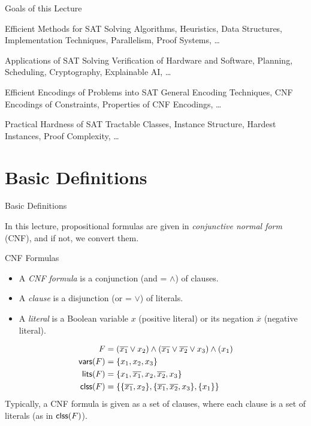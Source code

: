 \documentclass[t]{sdqbeamer}
\begin{document}
\begin{frame}{Goals of this Lecture}
\begin{block}{Efficient Methods for SAT Solving}
	Algorithms, Heuristics, Data Structures, Implementation Techniques, Parallelism, Proof Systems, \dots
\end{block}
\pause
\begin{block}{Applications of SAT Solving}
	Verification of Hardware and Software, Planning, Scheduling, Cryptography, Explainable AI, \dots
\end{block}
\pause
\begin{block}{Efficient Encodings of Problems into SAT}
	General Encoding Techniques, CNF Encodings of Constraints, Properties of CNF Encodings, \dots
\end{block}
\pause
\begin{block}{Practical Hardness of SAT}
	Tractable Classes, Instance Structure, Hardest Instances, Proof Complexity, \dots
\end{block}
\end{frame}


\section{Basic Definitions}

\begin{frame}{Basic Definitions}

In this lecture, propositional formulas are given in \emph{conjunctive normal form} (CNF), and if not, we convert them.

\begin{block}{CNF Formulas}
	\begin{itemize}
		\item A \emph{CNF formula} is a conjunction (and = $\wedge$) of clauses.
		\item A \emph{clause} is a disjunction (or = $\vee$) of literals.
		\item A \emph{literal} is a Boolean variable $x$ (positive literal) or its negation $\overline{x}$ (negative literal).
	\end{itemize}	
\end{block}

\begin{example}
	\vspace{-3ex}
	\begin{align*}
		F &= (\overline{x_1} \vee x_2) \wedge (\overline{x_1} \vee \overline {x_2} \vee x_3) \wedge (x_1)\\
		\textsf{vars} (F) &= \{x_1, x_2, x_3\}\\
		\textsf{lits} (F) &= \{x_1, \overline{x_1}, x_2, \overline{x_2}, x_3\}\\
		\textsf{clss} (F) &= \{ \{ \overline{x_1}, x_2 \}, \{ \overline{x_1}, \overline {x_2}, x_3 \}, \{ x_1 \} \}
	\end{align*}
	Typically, a CNF formula is given as a set of clauses, where each clause is a set of literals (as in $\textsf{clss} (F)$).
\end{example}
\end{frame}
\end{document}
